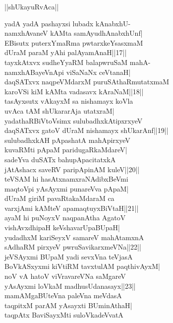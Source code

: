\documentclass{article}
\begin{document}
\begin{center}
||shUkayuRvAca||
\end{center}

yadA yadA pashayxsi lubadx kAnabxhU-\\
namxhAvaneV kAMta samAyudhAnabxhUnf|\\
EBisutx puterxYmaRma pwtarxkeYsasxmaM\\
dUraM paraM yAhi palAyamAnaH||17||\\
tayxkAtxvx sudheYyaRM balapwruSaM mahA-\\
namxhABayeVnApi viSaNaNx ceVtanaH|\\
daqSATxvx naqpeVMdarxM puruSAthaRmutatxmaM\\
karoVSi kiM kAMta vadasavx kAraNaM||18||\\
tasAyxsutx vAkayxM sa nishamayx koVla\\
uvAca tAM shUkararAja utatxraM|\\
yadathaRBiVtoVsimx sulubadhxkAtipxrxyeV\\
daqSATxvx gatoV dUraM nishamayx shUkarAnf||19||\\
sulubadhxkAH pApashatA mahApirxyeV\\
kuvaRMti pApaM paridugaRkaMdareV|\\
sadeYva duSATx bahupApacitatxkA\\
jAtAshacx saveRV paripApinAM kuleV||20||\\
teVSAM hi hasAtxnamxraNAdibxBeVmi\\
maqtoVpi yAsAyxmi punareVva pApaM|\\
dUraM giriM pavaRtakaMdaraM ca\\
varxjAmi kAMteV apamaqtuyxBiVtaH||21||\\
ayaM hi puNoyxV naqpanAtha AgatoV\\
vishAvxdhipaH keVshavarUpaBUpaH|\\
yudadhxM kariSeyxV samareV mahAtamxnA\\
sAdhaRM pirxyeV pwruSavikarxmeVNa||22||\\
jeVSAyxmi BUpaM yadi sevxVna teVjasA\\
BoVkASxyxmi kiVtiRM tavxtulAM paqthivAyxM|\\
noV vA hatoV viVravareVNa saMgareV\\
yAsAyxmi loVkaM madhusUdanasayx||23||\\
mamAMgaBUteVna paleVna meVdasA\\
taqpitxM parAM yAsayxti BUminAthaH|\\
taqpAtx BaviSayxMti suloVkadeVvatA\\
\end{document}

